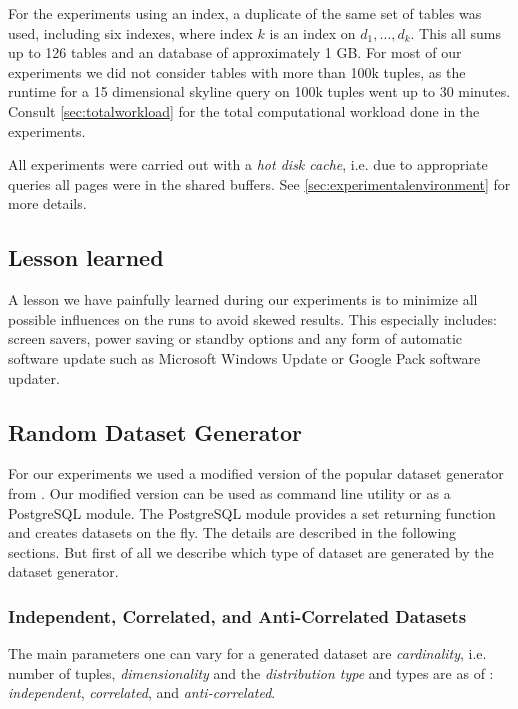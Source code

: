 For the experiments using an index, a duplicate of the same set of
tables was used, including six indexes, where index $k$ is an index on
$d_1, \ldots, d_k$.  This all sums up to 126 tables and an database of
approximately 1 GB.  For most of our experiments we did not consider
tables with more than 100k tuples, as the runtime for a 15 dimensional
skyline query on 100k tuples went up to 30 minutes. Consult
\autoref{sec:totalworkload} for the total computational workload
done in the experiments.


All experiments were carried out with a \emph{hot disk cache},
i.e. due to appropriate queries all pages were in the shared
buffers. See \autoref{sec:experimentalenvironment} for more
details.


\subsection{Lesson learned}
\label{sec:lessonlearned}
A lesson we have painfully learned during our experiments is to
minimize all possible influences on the runs to avoid skewed
results. This especially includes: screen savers, power saving or
standby options and any form of automatic software update such as
Microsoft Windows Update or Google Pack software updater.

\subsection{Random Dataset Generator}

For our experiments we used a modified version \citep{Eder2007a} of
the popular dataset generator from \citep{Borzsonyi2001}.  Our
modified version can be used as command line utility or as a
PostgreSQL module. The PostgreSQL module provides a set returning
function and creates datasets on the fly.  The details are described
in the following sections.  But first of all we describe which type of
dataset are generated by the dataset generator.

\subsubsection{Independent, Correlated, and Anti-Correlated Datasets}
\label{sec:corr-anti-indep}

The main parameters one can vary for a generated dataset are
\emph{cardinality}, i.e. number of tuples, \emph{dimensionality} and
the \emph{distribution type} and types are as of \citep{Borzsonyi2001}: 
\emph{independent}, \emph{correlated}, and \emph{anti-correlated}.

